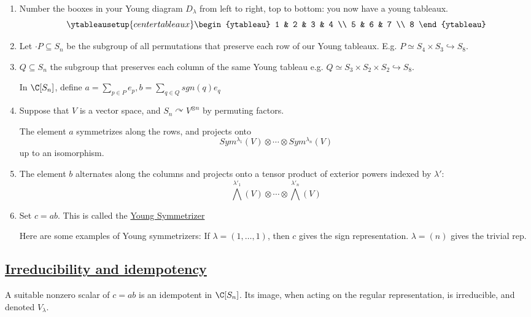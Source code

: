 \documentclass[x11names,reqno,14pt]{extarticle}
\newcommand{\into}{\hookrightarrow}
\begin{document}
\begin{enumerate}

\item Number the booxes in your Young diagram $D_\lambda$ from left to right, top to bottom: you now have a young tableaux. 
\[
\ytableausetup{centertableaux}
\begin{ytableau}
1 & 2 & 3 & 4 \\
5 & 6 & 7 \\
8
\end{ytableau}
\]

\item Let $\cdot P \subseteq S_n$ be the subgroup of all permutations that preserve each row of our Young tableaux. E.g. $P \simeq S_4\times S_3 \into S_8$. 

\item $Q \subseteq S_n$ the subgroup that preserves each column of the same Young tableau e.g. $Q \simeq S_3 \times S_2 \times S_2 \into S_8$. 

In $\C[S_n]$, define $a = \sum_{p\in P}e_p, b = \sum_{q\in Q}sgn(q)e_q$

\item Suppose that $V$ is a vector space, and $S_n \curvearrowright V^{\otimes n}$ by permuting factors. 

The element $a$ symmetrizes along the rows, and projects onto 
\[
Sym^{\lambda_1}(V) \otimes \cdots \otimes Sym^{\lambda_n}(V)
\]
up to an isomorphism.

\item The element $b$ alternates along the columns and projects onto a tensor product of exterior powers indexed by $\lambda'$: 
\[
\bigwedge^{\lambda'_1}(V)\otimes \cdots \otimes \bigwedge^{\lambda'_n}(V)
\]

\item Set $c = ab$. This is called the \underline{Young Symmetrizer}

Here are some examples of Young symmetrizers:
If $\lambda = (1, \dots, 1)$, then $c$ gives the sign representation. $\lambda = (n)$ gives the trivial rep.

\end{enumerate}

\subsection*{\underline{Irreducibility and idempotency}}

\thm

A suitable nonzero scalar of $c = ab$ is an idempotent in $\C[S_n]$. Its image, when acting on the regular representation, is irreducible, and denoted $V_\lambda$.
\end{document}
